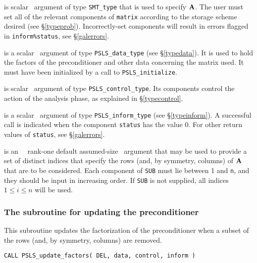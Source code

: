\documentclass{galahad}
\newcommand{\packagename}{PSLS}
\begin{document}
\begin{description}
 is scalar \intentin\ argument of type {\tt SMT\_type}
that is used to specify ${\mathbf{A}}$.
The user must set all of the relevant components of {\tt matrix} according
to the storage scheme desired (see \S\ref{typeprob}).
Incorrectly-set components will result in errors
flagged in {\tt inform\%status}, see \S\ref{galerrors}.

 is a scalar \intentinout\ argument of type
{\tt \packagename\_data\_type}
(see \S\ref{typedata}). It is used to hold the factors of the preconditioner 
and other data concerning the matrix used.
It must have been initialized by a call to
{\tt \packagename\_ini\-tialize}.

 is scalar \intentin\ argument of type
{\tt \packagename\_control\_type}. Its components control the action
of the analysis phase, as explained in
\S\ref{typecontrol}.

 is a scalar \intentinout\ argument of type
{\tt \packagename\_inform\_type}
(see \S\ref{typeinform}).
A successful call is indicated when the  component {\tt status} has the value 0.
For other return values of {\tt status}, see \S\ref{galerrors}.

 is an \optional\ \intentin\ rank-one default assumed-size 
\integer\ argument that may be used to provide a set of distinct indices
that specify the rows (and, by symmetry, columns) of ${\mathbf{A}}$ that are 
to be considered. Each component of {\tt SUB} must lie between 1 and {\tt n},
and they should be input in increasing order.
If {\tt SUB} is not supplied, all indices $1 \leq i \leq n$ will be used. 
\end{description}


\subsubsection{The subroutine for updating the preconditioner}
This subroutine updates the factorization of the preconditioner
when a subset of the rows (and, by symmetry, columns) are removed.

\hskip0.5in
{\tt CALL \packagename\_update\_factors( DEL, data, control, inform )}
\end{document}
